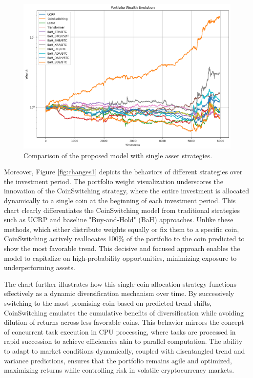 \begin{figure}[h]
	\centering
	\includegraphics[scale=0.6]{./ms1.png}
	\caption{Comparison of the proposed model with single asset strategies.}
	\label{fig:versions}
\end{figure}

Moreover, Figure \ref{fig:changes1} depicts the behaviors of different strategies over the investment period. The portfolio weight visualization underscores the innovation of the CoinSwitching strategy, where the entire investment is allocated dynamically to a single coin at the beginning of each investment period. This chart clearly differentiates the CoinSwitching model from traditional strategies such as UCRP and baseline "Buy-and-Hold" (BaH) approaches. Unlike these methods, which either distribute weights equally or fix them to a specific coin, CoinSwitching actively reallocates 100\% of the portfolio to the coin predicted to show the most favorable trend. This decisive and focused approach enables the model to capitalize on high-probability opportunities, minimizing exposure to underperforming assets.

The chart further illustrates how this single-coin allocation strategy functions effectively as a dynamic diversification mechanism over time. By successively switching to the most promising coin based on predicted trend shifts, CoinSwitching emulates the cumulative benefits of diversification while avoiding dilution of returns across less favorable coins. This behavior mirrors the concept of concurrent task execution in CPU processing, where tasks are processed in rapid succession to achieve efficiencies akin to parallel computation. The ability to adapt to market conditions dynamically, coupled with disentangled trend and variance predictions, ensures that the portfolio remains agile and optimized, maximizing returns while controlling risk in volatile cryptocurrency markets.


